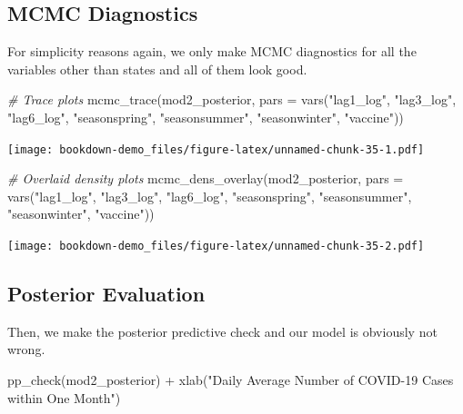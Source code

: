 \documentclass[
]{book}
\newenvironment{Shaded}{\begin{snugshade}}{\end{snugshade}}
\newcommand{\AttributeTok}[1]{\textcolor[rgb]{0.77,0.63,0.00}{#1}}
\newcommand{\CommentTok}[1]{\textcolor[rgb]{0.56,0.35,0.01}{\textit{#1}}}
\newcommand{\FunctionTok}[1]{\textcolor[rgb]{0.00,0.00,0.00}{#1}}
\newcommand{\NormalTok}[1]{#1}
\newcommand{\SpecialCharTok}[1]{\textcolor[rgb]{0.00,0.00,0.00}{#1}}
\newcommand{\StringTok}[1]{\textcolor[rgb]{0.31,0.60,0.02}{#1}}
\begin{document}
\hypertarget{mcmc-diagnostics-1}{%
\subsection{MCMC Diagnostics}\label{mcmc-diagnostics-1}}

For simplicity reasons again, we only make MCMC diagnostics for all the variables other than states and all of them look good.

\begin{Shaded}
\begin{Highlighting}[]
\CommentTok{\# Trace plots}
\FunctionTok{mcmc\_trace}\NormalTok{(mod2\_posterior, }\AttributeTok{pars =} \FunctionTok{vars}\NormalTok{(}\StringTok{"lag1\_log"}\NormalTok{, }\StringTok{"lag3\_log"}\NormalTok{, }\StringTok{"lag6\_log"}\NormalTok{, }\StringTok{"seasonspring"}\NormalTok{, }\StringTok{"seasonsummer"}\NormalTok{, }\StringTok{"seasonwinter"}\NormalTok{, }\StringTok{"vaccine"}\NormalTok{)) }
\end{Highlighting}
\end{Shaded}

\texttt{[image: bookdown-demo\_files/figure-latex/unnamed-chunk-35-1.pdf]}

\begin{Shaded}
\begin{Highlighting}[]
\CommentTok{\# Overlaid density plots}
\FunctionTok{mcmc\_dens\_overlay}\NormalTok{(mod2\_posterior, }\AttributeTok{pars =} \FunctionTok{vars}\NormalTok{(}\StringTok{"lag1\_log"}\NormalTok{, }\StringTok{"lag3\_log"}\NormalTok{, }\StringTok{"lag6\_log"}\NormalTok{, }\StringTok{"seasonspring"}\NormalTok{, }\StringTok{"seasonsummer"}\NormalTok{, }\StringTok{"seasonwinter"}\NormalTok{, }\StringTok{"vaccine"}\NormalTok{)) }
\end{Highlighting}
\end{Shaded}

\texttt{[image: bookdown-demo\_files/figure-latex/unnamed-chunk-35-2.pdf]}

\hypertarget{posterior-evaluation-1}{%
\subsection{Posterior Evaluation}\label{posterior-evaluation-1}}

Then, we make the posterior predictive check and our model is obviously not wrong.

\begin{Shaded}
\begin{Highlighting}[]
\FunctionTok{pp\_check}\NormalTok{(mod2\_posterior) }\SpecialCharTok{+} 
    \FunctionTok{xlab}\NormalTok{(}\StringTok{"Daily Average Number of COVID{-}19 Cases within One Month"}\NormalTok{)}
\end{Highlighting}
\end{Shaded}
\end{document}
